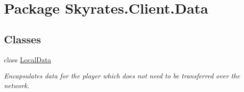 \hypertarget{namespace_skyrates_1_1_client_1_1_data}{\section{Package Skyrates.\-Client.\-Data}
\label{namespace_skyrates_1_1_client_1_1_data}
}
\subsection*{Classes}
\begin{DoxyCompactItemize}
\item 
class \hyperlink{class_skyrates_1_1_client_1_1_data_1_1_local_data}{Local\-Data}
\begin{DoxyCompactList}\small\item\em Encapsulates data for the player which does not need to be transferred over the network. \end{DoxyCompactList}\end{DoxyCompactItemize}
